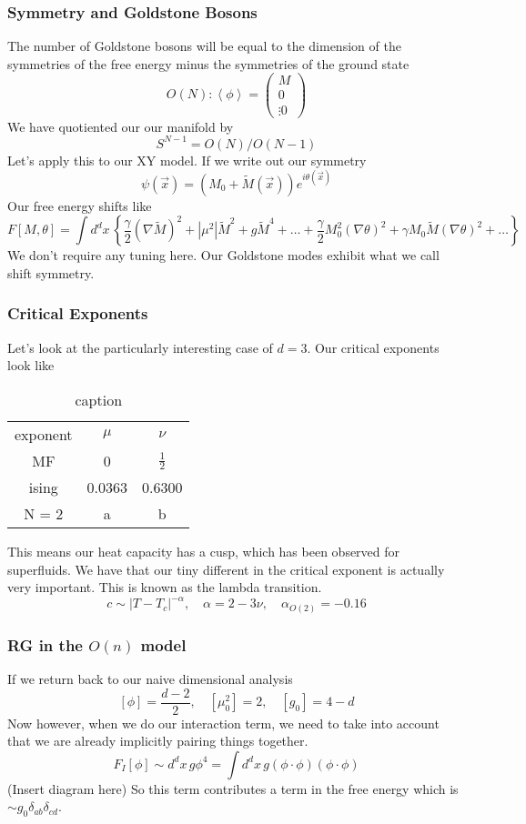 \subsubsection{Symmetry and Goldstone Bosons} 
The number of Goldstone bosons will be equal to the 
dimension of the symmetries of the free energy
minus the symmetries of the ground state
\[
O ( N ) : \left< \phi  \right>  = \begin{pmatrix} M \\ 0 \\ \vdots 0  \end{pmatrix} 
\] We have quotiented our our manifold by 
\[
S ^{ N - 1 }  = O ( N ) / O ( N - 1) 
\] 
Let's apply this to our XY model. 
If we write out our symmetry 
\[
\psi ( \vec{x} )  = \left(  M_ 0 + \tilde{ M } ( \vec{x} )   \right)  e^{ i \theta ( \vec{x} ) }
\] Our free energy shifts like
\[
F [ M , \theta ]  = \int d ^ d x \, \left\{  
\frac{\gamma }{ 2 } ( \nabla  \tilde{ M } ) ^ 2 + | \mu ^ 2 | \tilde{M} ^ 2 + 
g \tilde{ M } ^ 4 + \dots + \frac{\gamma }{ 2 } M _0 ^ 2 ( \nabla \theta ) ^ 2 + 
\gamma M _ 0 \tilde{ M } ( \nabla \theta ) ^ 2 + \dots \right\} 
\] We don't require any tuning here. Our Goldstone modes exhibit 
what we call shift symmetry. 

\subsubsection{Critical Exponents} 
Let's look at the particularly interesting 
case of $ d = 3 $. Our critical exponents look like
\begin{table}[htpb]
\centering
\caption{caption}
\label{tab:label}
\begin{tabular}{c c c }
	exponent & $ \mu $  & $ \nu $ \\
	MF & 0 & $ \frac{1}{2 }$ \\
	ising & 0.0363 & 0.6300 \\
	N = 2 &  a & b  \\ 
\end{tabular}
\end{table}
This means our heat capacity has a cusp, 
which has been observed for superfluids. 
We have that our tiny different in the critical exponent is actually very important. 
This is known as the lambda transition. 
\[
c \sim | T - T _ c |^{ - \alpha } , \quad \alpha   = 2 - 3 \nu , \quad \alpha _{ O ( 2) } = - 0.16 
\] 
\subsubsection{RG in the $ O ( n ) $ model} 
If we return back to our naive dimensional analysis 
\[
[ \phi ] = \frac{ d - 2 }{ 2 }, \quad [ \mu _ 0 ^ 2 ] = 2 , \quad [ g _ 0 ] = 4 - d 
\] Now however, when 
we do our interaction term, we need to take into 
account that we are already implicitly pairing things 
together. 
\[
F _ I [ \phi ] \sim d ^ d x \, g \phi ^ 4  = \int d ^ d x \, g ( \phi \cdot  \phi ) ( \phi \cdot  \phi ) 
\] (Insert diagram here) 
So this term contributes a term in the free energy which is $ \sim g_ 0 \delta _{ ab } \delta _{ cd } $. 

